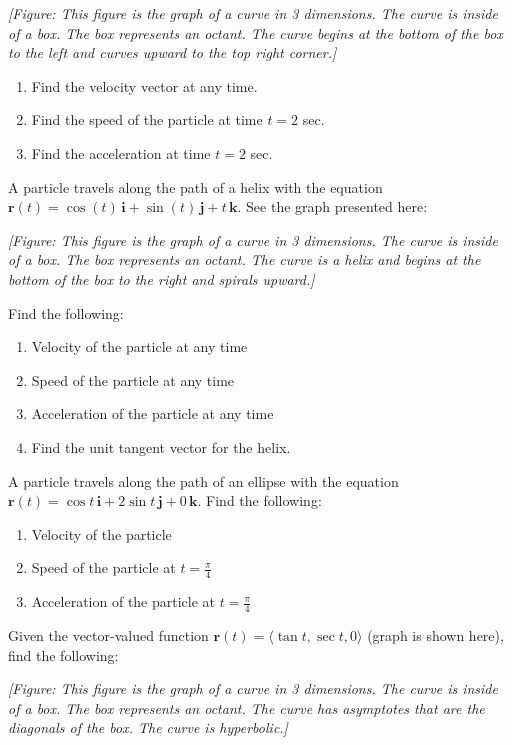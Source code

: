 \documentclass{exercises}
\begin{document}
\textit{[Figure: This figure is the graph of a curve in 3 dimensions. The curve is inside of a box. The box represents an octant. The curve begins at the bottom of the box to the left and curves upward to the top right corner.]}

\begin{enumerate}[resume]
\item Find the velocity vector at any time.
\item Find the speed of the particle at time $t=2$ sec.
\item Find the acceleration at time $t=2$ sec.
\end{enumerate}

A particle travels along the path of a helix with the equation $\mathbf{r}(t)=\cos(t)\,\mathbf{i}+\sin(t)\,\mathbf{j}+t\,\mathbf{k}$. See the graph presented here:


\textit{[Figure: This figure is the graph of a curve in 3 dimensions. The curve is inside of a box. The box represents an octant. The curve is a helix and begins at the bottom of the box to the right and spirals upward.]}


Find the following:

\begin{enumerate}[resume]
\item Velocity of the particle at any time
\item Speed of the particle at any time
\item Acceleration of the particle at any time
\item Find the unit tangent vector for the helix.
\end{enumerate}

A particle travels along the path of an ellipse with the equation $\mathbf{r}(t)=\cos t\,\mathbf{i}+2\sin t\,\mathbf{j}+0\,\mathbf{k}$. Find the following:

\begin{enumerate}[resume]
\item Velocity of the particle
\item Speed of the particle at $t=\frac{\pi}{4}$
\item Acceleration of the particle at $t=\frac{\pi}{4}$
\end{enumerate}

Given the vector-valued function $\mathbf{r}(t)=\langle \tan t,\sec t,0\rangle$ (graph is shown here), find the following:


\textit{[Figure: This figure is the graph of a curve in 3 dimensions. The curve is inside of a box. The box represents an octant. The curve has asymptotes that are the diagonals of the box. The curve is hyperbolic.]}
\end{document}
